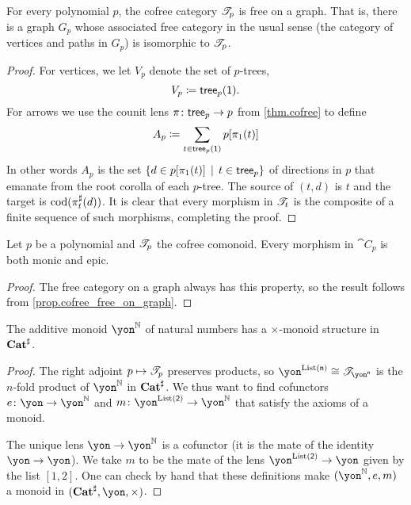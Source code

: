 \documentclass[Book-Poly]{subfiles}
\begin{document}
\begin{proposition}\label{prop.cofree_free_on_graph}
For every polynomial $p$, the cofree category $\mathscr{T}_{p}$ is free on a graph. That is, there is a graph $G_p$ whose associated free category in the usual sense (the category of vertices and paths in $G_p$) is isomorphic to $\mathscr{T}_{p}$.
\end{proposition}
\begin{proof}
For vertices, we let $V_p$ denote the set of $p$-trees,
\[V_p\coloneqq\mathsf{tree}_p(\textsf{1}).\]
For arrows we use the counit lens $\pi\colon\mathsf{tree}_p\to p$ from \cref{thm.cofree} to define
\[
A_p\coloneqq\sum_{t\in\mathsf{tree}_p(\textsf{1})}p[\pi_1(t)]
\]
In other words $A_p$ is the set $\{d\in p[\pi_1(t)]\,\mid\,t\in\mathsf{tree}_p\}$ of directions in $p$ that emanate from the root corolla of each $p$-tree. The source of $(t,d)$ is $t$ and the target is $\operatorname{cod}(\pi^\sharp_t(d))$. It is clear that every morphism in $\mathscr{T}_{t}$ is the composite of a finite sequence of such morphisms, completing the proof.
\end{proof}


\begin{corollary}
Let $p$ be a polynomial and $\mathscr{T}_{p}$ the cofree comonoid. Every morphism in $\cat{C}_p$ is both monic and epic.
\end{corollary}
\begin{proof}
The free category on a graph always has this property, so the result follows from \cref{prop.cofree_free_on_graph}.
\end{proof}

\begin{proposition}\label{prop.ynn_monoid}
The additive monoid $\yon^\nn$ of natural numbers has a $\times$-monoid structure in $\mathbf{Cat}^\sharp$.
\end{proposition}
\begin{proof}
The right adjoint $p\mapsto\mathscr{T}_{p}$ preserves products, so $\yon^{\List(\ord{n})}\cong\cofree{\yon^{\ord{n}}}$ is the $n$-fold product of $\yon^\nn$ in $\mathbf{Cat}^\sharp$. We thus want to find cofunctors $e\colon \yon\to\yon^\nn$ and $m\colon\yon^{\List(\2)}\to\yon^\nn$ that satisfy the axioms of a monoid.

The unique lens $\yon\to\yon^\nn$ is a cofunctor (it is the mate of the identity $\yon\to\yon$). We take $m$ to be the mate of the lens $\yon^{\List(\2)}\to\yon$ given by the list $[1,2]$. One can check by hand that these definitions make $(\yon^\nn,e,m)$ a monoid in $(\smcat^\sharp,\yon,\times)$.
\end{proof}
\end{document}
